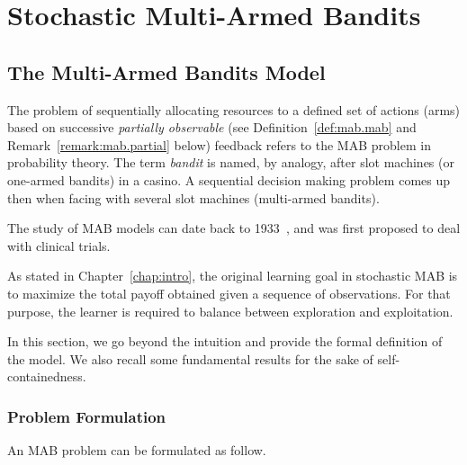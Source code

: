 \chapter{Stochastic Multi-Armed Bandits}\label{chap:mab}
	\minitoc
	\newpage


\section{The Multi-Armed Bandits Model}\label{sec:mab.model}

The problem of sequentially allocating resources to a defined set of actions (arms) based on successive \emph{partially observable} (see Definition~\ref{def:mab.mab} and Remark~\ref{remark:mab.partial} below) feedback refers to the MAB problem in probability theory. The term \emph{bandit} is named, by analogy, after slot machines (or one-armed bandits) in a casino. A sequential decision making problem comes up then when facing with several slot machines (multi-armed bandits).

The study of MAB models can date back to 1933~\citep{thompson1933}, and was first proposed to deal with clinical trials. 

As stated in Chapter~\ref{chap:intro}, the original learning goal in stochastic MAB is to maximize the total payoff obtained given a sequence of observations. For that purpose, the learner is required to balance between exploration and exploitation.

In this section, we go beyond the intuition and provide the formal definition of the model. We also recall some fundamental results for the sake of self-containedness.

\subsection{Problem Formulation}\label{sec:mab.model.formulation}

An MAB problem can be formulated as follow.

